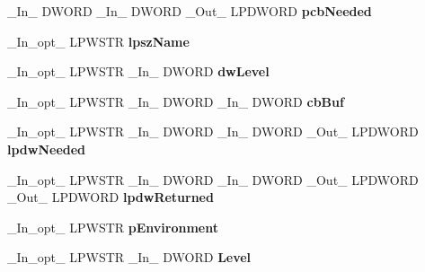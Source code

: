 \begin{DoxyCompactItemize}
\item 
\mbox{\label{struct___p_r_i_n_t_p_r_o_v_i_d_o_r_a6643fd1f42e71ba76b8dac945c279b7a}} 
\+\_\+\+In\+\_\+ D\+W\+O\+RD \+\_\+\+In\+\_\+ D\+W\+O\+RD \+\_\+\+Out\+\_\+ L\+P\+D\+W\+O\+RD {\bfseries pcb\+Needed}
\item 
\mbox{\label{struct___p_r_i_n_t_p_r_o_v_i_d_o_r_aa284f5eb712f21816404e49911ce2779}} 
\+\_\+\+In\+\_\+opt\+\_\+ L\+P\+W\+S\+TR {\bfseries lpsz\+Name}
\item 
\mbox{\label{struct___p_r_i_n_t_p_r_o_v_i_d_o_r_ab5ab8c7e788fc48b3e80b985a0ef7474}} 
\+\_\+\+In\+\_\+opt\+\_\+ L\+P\+W\+S\+TR \+\_\+\+In\+\_\+ D\+W\+O\+RD {\bfseries dw\+Level}
\item 
\mbox{\label{struct___p_r_i_n_t_p_r_o_v_i_d_o_r_a76dfa8883ba13e3a2862ce11a78b07a5}} 
\+\_\+\+In\+\_\+opt\+\_\+ L\+P\+W\+S\+TR \+\_\+\+In\+\_\+ D\+W\+O\+RD \+\_\+\+In\+\_\+ D\+W\+O\+RD {\bfseries cb\+Buf}
\item 
\mbox{\label{struct___p_r_i_n_t_p_r_o_v_i_d_o_r_a25ed68f16fc4c5e1069ff021f5b10c2d}} 
\+\_\+\+In\+\_\+opt\+\_\+ L\+P\+W\+S\+TR \+\_\+\+In\+\_\+ D\+W\+O\+RD \+\_\+\+In\+\_\+ D\+W\+O\+RD \+\_\+\+Out\+\_\+ L\+P\+D\+W\+O\+RD {\bfseries lpdw\+Needed}
\item 
\mbox{\label{struct___p_r_i_n_t_p_r_o_v_i_d_o_r_a000ef6a786440384b5e449e7150e0186}} 
\+\_\+\+In\+\_\+opt\+\_\+ L\+P\+W\+S\+TR \+\_\+\+In\+\_\+ D\+W\+O\+RD \+\_\+\+In\+\_\+ D\+W\+O\+RD \+\_\+\+Out\+\_\+ L\+P\+D\+W\+O\+RD \+\_\+\+Out\+\_\+ L\+P\+D\+W\+O\+RD {\bfseries lpdw\+Returned}
\item 
\mbox{\label{struct___p_r_i_n_t_p_r_o_v_i_d_o_r_a51b68a382014559860ffbccc5bddf47e}} 
\+\_\+\+In\+\_\+opt\+\_\+ L\+P\+W\+S\+TR {\bfseries p\+Environment}
\item 
\mbox{\label{struct___p_r_i_n_t_p_r_o_v_i_d_o_r_a01c3f1901ea699122d9d6d4937203773}} 
\+\_\+\+In\+\_\+opt\+\_\+ L\+P\+W\+S\+TR \+\_\+\+In\+\_\+ D\+W\+O\+RD {\bfseries Level}

\end{DoxyCompactItemize}
